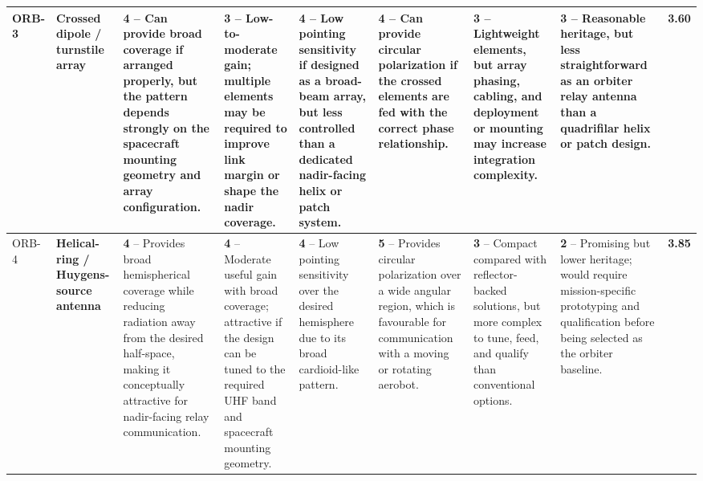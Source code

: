 \begin{table}[H]
{\begin{tabular}{|p{1.2cm}|p{3.0cm}|p{4.0cm}|p{3.5cm}|p{3.8cm}|p{3.7cm}|p{3.5cm}|p{3.8cm}|p{2.0cm}|}
ORB-3 &
\textbf{Crossed dipole / turnstile array} &
\cellcolor{score4!40}\textbf{4} -- Can provide broad coverage if arranged properly, but the pattern depends strongly on the spacecraft mounting geometry and array configuration. &
\cellcolor{score3!40}\textbf{3} -- Low-to-moderate gain; multiple elements may be required to improve link margin or shape the nadir coverage. &
\cellcolor{score4!40}\textbf{4} -- Low pointing sensitivity if designed as a broad-beam array, but less controlled than a dedicated nadir-facing helix or patch system. &
\cellcolor{score4!40}\textbf{4} -- Can provide circular polarization if the crossed elements are fed with the correct phase relationship. &
\cellcolor{score3!40}\textbf{3} -- Lightweight elements, but array phasing, cabling, and deployment or mounting may increase integration complexity. &
\cellcolor{score3!40}\textbf{3} -- Reasonable heritage, but less straightforward as an orbiter relay antenna than a quadrifilar helix or patch design. &
\cellcolor{score4!40}\textbf{3.60} \\
\hline

ORB-4 &
\textbf{Helical-ring / Huygens-source antenna} &
\cellcolor{score4!40}\textbf{4} -- Provides broad hemispherical coverage while reducing radiation away from the desired half-space, making it conceptually attractive for nadir-facing relay communication. &
\cellcolor{score4!40}\textbf{4} -- Moderate useful gain with broad coverage; attractive if the design can be tuned to the required UHF band and spacecraft mounting geometry. &
\cellcolor{score4!40}\textbf{4} -- Low pointing sensitivity over the desired hemisphere due to its broad cardioid-like pattern. &
\cellcolor{score5!40}\textbf{5} -- Provides circular polarization over a wide angular region, which is favourable for communication with a moving or rotating aerobot. &
\cellcolor{score3!40}\textbf{3} -- Compact compared with reflector-backed solutions, but more complex to tune, feed, and qualify than conventional options. &
\cellcolor{score2!40}\textbf{2} -- Promising but lower heritage; would require mission-specific prototyping and qualification before being selected as the orbiter baseline. &
\cellcolor{score4!40}\textbf{3.85} \\
\hline


\end{tabular}}
\end{table}
